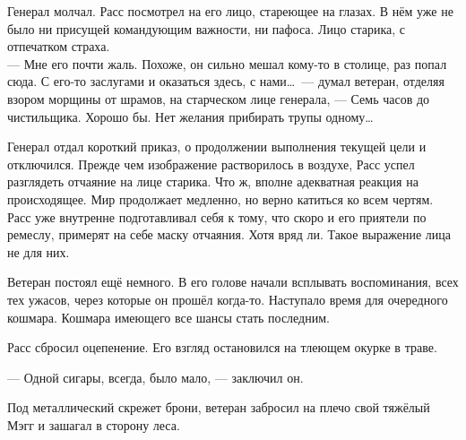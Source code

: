Генерал молчал. Расс посмотрел на его лицо, стареющее на глазах. В нём уже не 
было ни присущей командующим важности, ни пафоса. Лицо старика, с отпечатком 
страха.\\
--- Мне его почти жаль. Похоже, он сильно мешал кому-то в столице, раз попал 
сюда. С его-то заслугами и оказаться здесь, с нами\ldots\ --- думал ветеран, 
отделяя взором морщины от шрамов, на старческом лице генерала, --- Семь часов 
до чистильщика. Хорошо бы. Нет желания прибирать трупы одному\ldots

Генерал отдал короткий приказ, о продолжении выполнения текущей цели и 
отключился. Прежде чем изображение растворилось в воздухе, Расс успел разглядеть 
отчаяние на лице старика. Что ж, вполне адекватная реакция на происходящее. Мир 
продолжает медленно, но верно катиться ко всем чертям. Расс уже внутренне 
подготавливал себя к тому, что скоро и его приятели по ремеслу, примерят на себе 
маску отчаяния. Хотя вряд ли. Такое выражение лица не для них.

Ветеран постоял ещё немного. В его голове начали всплывать воспоминания, всех 
тех ужасов, через которые он прошёл когда-то. Наступало время для очередного 
кошмара. Кошмара имеющего все шансы стать последним.

Расс сбросил оцепенение. Его взгляд остановился на тлеющем окурке в траве.

--- Одной сигары, всегда, было мало, --- заключил он.

Под металлический скрежет брони, ветеран забросил на плечо свой тяжёлый Мэгг и 
зашагал в сторону леса.

\newpage


